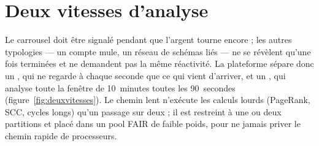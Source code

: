 \section{Deux vitesses d'analyse}
Le carrousel doit être signalé pendant que l'argent tourne encore ; les
autres typologies --- un compte mule, un réseau de schémas liés --- ne se
révèlent qu'une fois terminées et ne demandent pas la même réactivité. La
plateforme sépare donc un , qui ne regarde à chaque
seconde que ce qui vient d'arriver, et un , qui analyse
toute la fenêtre de 10~minutes toutes les 90~secondes
(figure~\ref{fig:deuxvitesses}). Le chemin lent n'exécute les calculs lourds
(PageRank, SCC, cycles longs) qu'un passage sur deux ; il est restreint à une
ou deux partitions et placé dans un pool FAIR de faible poids, pour ne jamais
priver le chemin rapide de processeurs.

